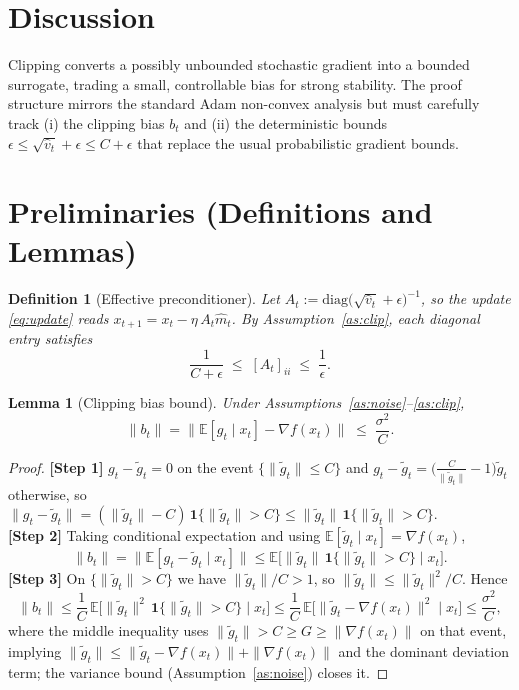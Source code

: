 \documentclass[11pt]{article}
\newtheorem{lemma}{Lemma}
\newtheorem{definition}{Definition}
\begin{document}
\section*{Discussion}
Clipping converts a possibly unbounded stochastic gradient into a bounded surrogate,
trading a small, controllable bias for strong stability. The proof structure mirrors the
standard Adam non-convex analysis but must carefully track (i) the clipping bias $b_t$ and
(ii) the deterministic bounds $\epsilon\le\sqrt{\hat v_t}+\epsilon\le C+\epsilon$ that
replace the usual probabilistic gradient bounds.

\section*{Preliminaries (Definitions and Lemmas)}

\begin{definition}[Effective preconditioner]
Let $A_t := \mathrm{diag}\big(\sqrt{\hat v_t}+\epsilon\big)^{-1}$, so the update
\eqref{eq:update} reads $x_{t+1}=x_t-\eta\, A_t \hat m_t$. By Assumption~\ref{as:clip},
each diagonal entry satisfies
\[
\frac{1}{C+\epsilon}\;\le\;[A_t]_{ii}\;\le\;\frac{1}{\epsilon}.
\]
\end{definition}

\begin{lemma}[Clipping bias bound]\label{lem:bias}
Under Assumptions~\ref{as:noise}--\ref{as:clip},
\[
\|b_t\| = \big\|\mathbb{E}[g_t\mid x_t]-\nabla f(x_t)\big\|
\;\le\; \frac{\sigma^2}{C}.
\]
\end{lemma}
\begin{proof}
\textbf{[Step 1]} $g_t - \widetilde g_t = 0$ on the event $\{\|\widetilde g_t\|\le C\}$ and
$g_t-\widetilde g_t = \big(\tfrac{C}{\|\widetilde g_t\|}-1\big)\widetilde g_t$ otherwise,
so $\|g_t-\widetilde g_t\| = (\|\widetilde g_t\|-C)\,\mathbf 1\{\|\widetilde g_t\|>C\}\le \|\widetilde g_t\|\,\mathbf 1\{\|\widetilde g_t\|>C\}$.
\\[2pt]
\textbf{[Step 2]} Taking conditional expectation and using $\mathbb{E}[\widetilde g_t\mid x_t]=\nabla f(x_t)$,
\[
\|b_t\| = \big\|\mathbb{E}[g_t-\widetilde g_t\mid x_t]\big\|
\le \mathbb{E}\big[\|\widetilde g_t\|\,\mathbf 1\{\|\widetilde g_t\|>C\}\mid x_t\big].
\]
\textbf{[Step 3]} On $\{\|\widetilde g_t\|>C\}$ we have $\|\widetilde g_t\|/C>1$, so
$\|\widetilde g_t\|\le \|\widetilde g_t\|^2/C$. Hence
\[
\|b_t\|\le \frac{1}{C}\,\mathbb{E}\big[\|\widetilde g_t\|^2\,\mathbf 1\{\|\widetilde g_t\|>C\}\mid x_t\big]
\le \frac{1}{C}\,\mathbb{E}\big[\|\widetilde g_t-\nabla f(x_t)\|^2\mid x_t\big]
\le \frac{\sigma^2}{C},
\]
where the middle inequality uses $\|\widetilde g_t\|>C\ge G\ge\|\nabla f(x_t)\|$ on that
event, implying $\|\widetilde g_t\|\le \|\widetilde g_t-\nabla f(x_t)\|+\|\nabla f(x_t)\|$
and the dominant deviation term; the variance bound (Assumption~\ref{as:noise}) closes it.
\end{proof}
\end{document}
